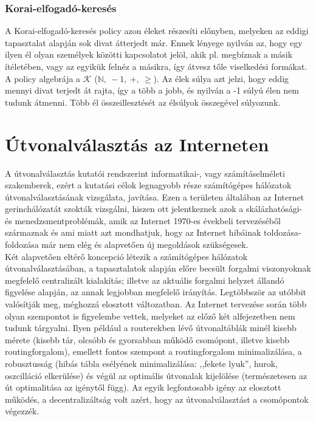       \subsubsection{Korai-elfogadó-keresés}\label{korai_elfogado_kereses}

      A Korai-elfogadó-keresés policy azon éleket részesíti előnyben, melyeken az eddigi tapasztalat alapján sok divat átterjedt már. Ennek lényege nyilván az, hogy egy ilyen él olyan személyek közötti kapcsolatot jelöl, akik pl. megbíznak a másik ítéletében, vagy az egyikük felnéz a másikra, így átvesz tőle viselkedési formákat. A policy algebrája a $\mathcal{K}$ ($\mathbb{N},~-1,~+,~\geq$). Az élek súlya azt jelzi, hogy eddig mennyi divat terjedt át rajta, így a több a jobb, és nyilván a -1 súlyú élen nem tudunk átmenni. Több él összeillesztését az élsúlyok összegével súlyozunk.\newpage


  \section{Útvonalválasztás az Interneten}

  A útvonalválasztás kutatói rendszerint informatikai-, vagy számításelméleti szakemberek, ezért a kutatási célok legnagyobb része számítógépes hálózatok útvonalválasztásának vizsgálata, javítása. Ezen a területen általában az Internet gerinchálózatát szokták vizsgálni, hiszen ott jelentkeznek azok a skálázhatósági- és menedzsmentproblémák, amik az Internet 1970-es évekbeli tervezéséből származnak és ami miatt azt mondhatjuk, hogy az Internet hibáinak toldozása-foldozása már nem elég és alapvetően új megoldások szükségesek.\\

  Két alapvetően eltérő koncepció létezik a számítógépes hálózatok útvonalválasztásában, a tapasztalatok alapján előre becsült forgalmi viszonyoknak megfelelő centralizált kialakítás; illetve az aktuális forgalmi helyzet állandó figyelése alapján, az annak legjobban megfelelő irányítás. Legtöbbször az utóbbit valósítják meg, méghozzá elosztott változatban. Az Internet tervezése során több olyan szempontot is figyelembe vettek, melyeket az előző két alfejezetben nem tudunk tárgyalni. Ilyen például a routerekben lévő útvonaltáblák minél kisebb mérete (kisebb tár, olcsóbb és gyorsabban működő csomópont, illetve kisebb routingforgalom), emellett fontos szempont a routingforgalom minimalizálása, a robusztusság (hibás tábla esélyének minimalizálása: ,,fekete lyuk'', hurok, oszcilláció elkerülése) és végül az optimális útvonalak kijelölése (természetesen az út optimalitása az igénytől függ). Az egyik legfontosabb igény az elosztott működés, a decentralizáltság volt azért, hogy az útvonalválasztást a csomópontok végezzék.\\

